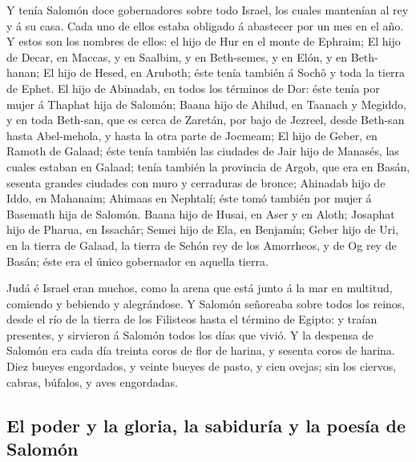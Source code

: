  Y tenía Salomón doce gobernadores sobre todo Israel, los
cuales mantenían al rey y á su casa. Cada uno de ellos estaba obligado á
abastecer por un mes en el año.  Y estos son los nombres de
ellos: el hijo de Hur en el monte de Ephraim;  El hijo de
Decar, en Maccas, y en Saalbim, y en Beth-semes, y en Elón, y en
Beth-hanan;  El hijo de Hesed, en Aruboth; éste tenía
también á Sochô y toda la tierra de Ephet.  El hijo de
Abinadab, en todos los términos de Dor: éste tenía por mujer á Thaphat
hija de Salomón;  Baana hijo de Ahilud, en Taanach y
Megiddo, y en toda Beth-san, que es cerca de Zaretán, por bajo de
Jezreel, desde Beth-san hasta Abel-mehola, y hasta la otra parte de
Jocmeam;  El hijo de Geber, en Ramoth de Galaad; éste tenía
también las ciudades de Jair hijo de Manasés, las cuales estaban en
Galaad; tenía también la provincia de Argob, que era en Basán, sesenta
grandes ciudades con muro y cerraduras de bronce;  Ahinadab
hijo de Iddo, en Mahanaim;  Ahimaas en Nephtalí; éste tomó
también por mujer á Basemath hija de Salomón.  Baana hijo
de Husai, en Aser y en Aloth;  Josaphat hijo de Pharua, en
Issachâr;  Semei hijo de Ela, en Benjamín; 
Geber hijo de Uri, en la tierra de Galaad, la tierra de Sehón rey de los
Amorrheos, y de Og rey de Basán; éste era el único gobernador en aquella
tierra.

 Judá é Israel eran muchos, como la arena que está junto á
la mar en multitud, comiendo y bebiendo y alegrándose.  Y
Salomón señoreaba sobre todos los reinos, desde el río de la tierra de
los Filisteos hasta el término de Egipto: y traían presentes, y
sirvieron á Salomón todos los días que vivió.  Y la
despensa de Salomón era cada día treinta coros de flor de harina, y
sesenta coros de harina.  Diez bueyes engordados, y veinte
bueyes de pasto, y cien ovejas; sin los ciervos, cabras, búfalos, y aves
engordadas.

\hypertarget{el-poder-y-la-gloria-la-sabiduruxeda-y-la-poesuxeda-de-salomuxf3n}{%
\subsection{El poder y la gloria, la sabiduría y la poesía de
Salomón}\label{el-poder-y-la-gloria-la-sabiduruxeda-y-la-poesuxeda-de-salomuxf3n}}

